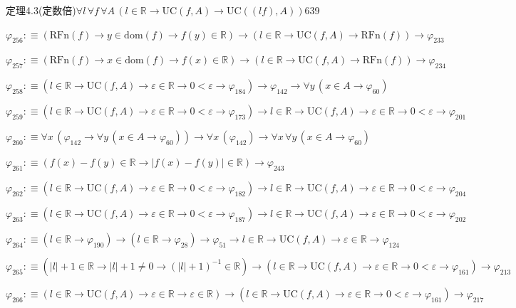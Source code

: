 \begin{fullproof}{定理4.3(定数倍)}{$\forall l\,\forall f\,\forall A\,(l \in \mathbb{R} \to \mathrm{UC}(f,A) \to \mathrm{UC}((l f),A))$}{639}
\begin{abbrevlist}
\item $\varphi_{256} :\equiv (\mathrm{RFn}(f) \to y \in \mathrm{dom}(f) \to f(y) \in \mathbb{R}) \to (l \in \mathbb{R} \to \mathrm{UC}(f,A) \to \mathrm{RFn}(f)) \to \varphi_{233}$
\item $\varphi_{257} :\equiv (\mathrm{RFn}(f) \to x \in \mathrm{dom}(f) \to f(x) \in \mathbb{R}) \to (l \in \mathbb{R} \to \mathrm{UC}(f,A) \to \mathrm{RFn}(f)) \to \varphi_{234}$
\item $\varphi_{258} :\equiv (l \in \mathbb{R} \to \mathrm{UC}(f,A) \to \varepsilon \in \mathbb{R} \to 0 < \varepsilon \to \varphi_{184}) \to \varphi_{142} \to \forall y\,(x \in A \to \varphi_{60})$
\item $\varphi_{259} :\equiv (l \in \mathbb{R} \to \mathrm{UC}(f,A) \to \varepsilon \in \mathbb{R} \to 0 < \varepsilon \to \varphi_{173}) \to l \in \mathbb{R} \to \mathrm{UC}(f,A) \to \varepsilon \in \mathbb{R} \to 0 < \varepsilon \to \varphi_{201}$
\item $\varphi_{260} :\equiv \forall x\,(\varphi_{142} \to \forall y\,(x \in A \to \varphi_{60})) \to \forall x\,(\varphi_{142}) \to \forall x\,\forall y\,(x \in A \to \varphi_{60})$
\item $\varphi_{261} :\equiv (f(x) - f(y) \in \mathbb{R} \to \lvert f(x) - f(y) \rvert \in \mathbb{R}) \to \varphi_{243}$
\item $\varphi_{262} :\equiv (l \in \mathbb{R} \to \mathrm{UC}(f,A) \to \varepsilon \in \mathbb{R} \to 0 < \varepsilon \to \varphi_{182}) \to l \in \mathbb{R} \to \mathrm{UC}(f,A) \to \varepsilon \in \mathbb{R} \to 0 < \varepsilon \to \varphi_{204}$
\item $\varphi_{263} :\equiv (l \in \mathbb{R} \to \mathrm{UC}(f,A) \to \varepsilon \in \mathbb{R} \to 0 < \varepsilon \to \varphi_{187}) \to l \in \mathbb{R} \to \mathrm{UC}(f,A) \to \varepsilon \in \mathbb{R} \to 0 < \varepsilon \to \varphi_{202}$
\item $\varphi_{264} :\equiv (l \in \mathbb{R} \to \varphi_{190}) \to (l \in \mathbb{R} \to \varphi_{28}) \to \varphi_{51} \to l \in \mathbb{R} \to \mathrm{UC}(f,A) \to \varepsilon \in \mathbb{R} \to \varphi_{124}$
\item $\varphi_{265} :\equiv (\lvert l \rvert + 1 \in \mathbb{R} \to \lvert l \rvert + 1 \neq 0 \to (\lvert l \rvert + 1)^{-1} \in \mathbb{R}) \to (l \in \mathbb{R} \to \mathrm{UC}(f,A) \to \varepsilon \in \mathbb{R} \to 0 < \varepsilon \to \varphi_{161}) \to \varphi_{213}$
\item $\varphi_{266} :\equiv (l \in \mathbb{R} \to \mathrm{UC}(f,A) \to \varepsilon \in \mathbb{R} \to \varepsilon \in \mathbb{R}) \to (l \in \mathbb{R} \to \mathrm{UC}(f,A) \to \varepsilon \in \mathbb{R} \to 0 < \varepsilon \to \varphi_{161}) \to \varphi_{217}$

\end{abbrevlist}
\end{fullproof}
